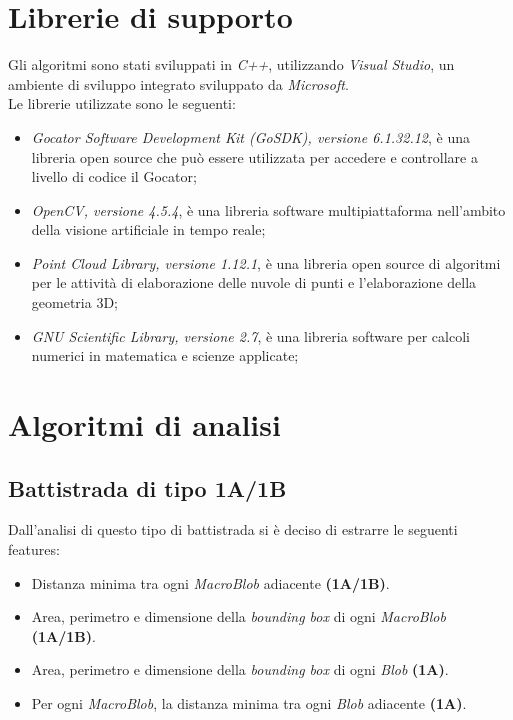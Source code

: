 \newpage

\section{Librerie di supporto}
Gli algoritmi sono stati sviluppati in \textit{C++}, utilizzando \textit{Visual Studio}, un ambiente di sviluppo integrato sviluppato da \textit{Microsoft}.\\
\newline
Le librerie utilizzate sono le seguenti:

\begin{itemize}
	\item \textit{Gocator Software Development Kit (GoSDK), versione 6.1.32.12}, è una libreria open source che può essere utilizzata per accedere e controllare a livello di codice il Gocator;
	\item \textit{OpenCV, versione 4.5.4}, è una libreria software multipiattaforma nell'ambito della visione artificiale in tempo reale;
	\item \textit{Point Cloud Library, versione 1.12.1}, è una libreria open source di algoritmi per le attività di elaborazione delle nuvole di punti e l'elaborazione della geometria 3D;
	\item \textit{GNU Scientific Library, versione 2.7}, è una libreria software per calcoli numerici in matematica e scienze applicate;
\end{itemize}

\section{Algoritmi di analisi}

\subsection{Battistrada di tipo 1A/1B}
Dall'analisi di questo tipo di battistrada si è deciso di estrarre le seguenti features:
\begin{itemize}
	\item Distanza minima tra ogni \textit{MacroBlob} adiacente \textbf{(1A/1B)}.
	\item Area, perimetro e dimensione della \textit{bounding box} di ogni \textit{MacroBlob} \textbf{(1A/1B)}.
	\item Area, perimetro e dimensione della \textit{bounding box} di ogni \textit{Blob} \textbf{(1A)}.
	\item Per ogni \textit{MacroBlob}, la distanza minima tra ogni \textit{Blob} adiacente \textbf{(1A)}.
\end{itemize}

